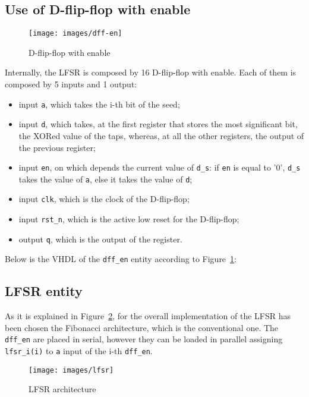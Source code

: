 \documentclass[11pt,a4paper,oneside, openright]{article}
\begin{document}
\subsection{Use of D-flip-flop with enable}

\begin{figure}[h]
    \centering
    \texttt{[image: images/dff-en]}
    \caption{D-flip-flop with enable}
    \label{fig:dff-en}
\end{figure}

Internally, the LFSR is composed by 16 D-flip-flop with enable. Each of them is composed by 5 inputs and 1 output:
\begin{itemize}
    \item input \texttt{a}, which takes the i-th bit of the seed;
    \item input \texttt{d}, which takes, at the first register that stores the most significant bit, the XORed value of the taps, whereas, at all the other registers, the output of the previous register;
    \item input \texttt{en}, on which depends the current value of \texttt{d\_s}: if \texttt{en} is equal to '0', \texttt{d\_s} takes the value of \texttt{a}, else it takes the value of \texttt{d};
    \item input \texttt{clk}, which is the clock of the D-flip-flop;
    \item input \texttt{rst\_n}, which is the active low reset for the D-flip-flop;
    \item output \texttt{q}, which is the output of the register.
    \end{itemize}
  
Below is the VHDL of the \texttt{dff\_en} entity according to Figure~\ref{fig:dff-en}:



\subsection{LFSR entity}
As it is explained in Figure~\ref{fig:lfsr}, for the overall implementation of the LFSR has been chosen the Fibonacci architecture, which is the conventional one. The \texttt{dff\_en} are placed in serial, however they can be loaded in parallel assigning \texttt{lfsr\_i(i)} to \texttt{a} input of the i-th \texttt{dff\_en}.

\begin{figure}[h]
    \centering
    \texttt{[image: images/lfsr]}
    \caption{LFSR architecture}
    \label{fig:lfsr}
\end{figure}
\end{document}
